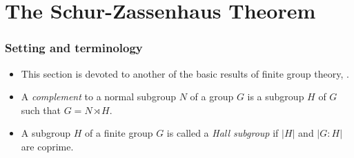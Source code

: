 \documentclass[../Odyssey_Project.tex]{subfiles}
\begin{document}
\setcounter{section}{8}
\section{The Schur-Zassenhaus Theorem}

\subsubsection*{Setting and terminology}
\begin{itemize}
    \item This section is devoted to another of the basic results of finite group theory, .
    \item A \emph{complement} to a normal subgroup $N$ of a group $G$ is a subgroup $H$ of $G$ such that $G = N \rtimes H$.
    \item A subgroup $H$ of a finite group $G$ is called a \emph{Hall subgroup} if $|H|$ and $|G:H|$ are coprime.
\end{itemize}
\end{document}
